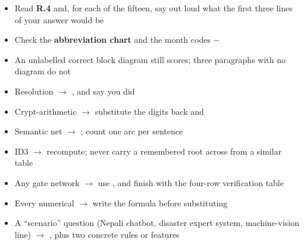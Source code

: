 {\begin{itemize}
        they are the traps
  \item[$\square$] Read \textbf{R.4} and, for each of the fifteen, say out loud what the
        first three lines of your answer would be
  \item[$\square$] Check the \textbf{abbreviation chart} and the month codes $-$
\end{itemize}
\begin{itemize}
  \item[$\square$]  An unlabelled correct
        block diagram still scores; three paragraphs with no diagram do not
  \item[$\square$] Resolution $\rightarrow$ , and say you did
  \item[$\square$] Crypt-arithmetic $\rightarrow$ substitute the digits back and
  \item[$\square$] Semantic net $\rightarrow$ ; count one arc per sentence
  \item[$\square$] ID3 $\rightarrow$ recompute; never carry a remembered root across from
        a similar table
  \item[$\square$] Any gate network $\rightarrow$ use , and finish with the four-row verification table
  \item[$\square$] Every numerical $\rightarrow$ write the formula before substituting
  \item[$\square$] A ``scenario'' question (Nepali chatbot, disaster expert system,
        machine-vision line) $\rightarrow$ , plus two concrete rules or features
\end{itemize}}
